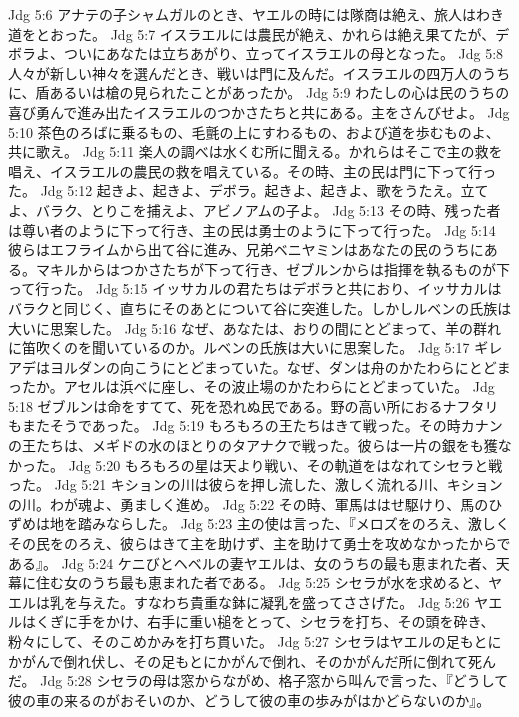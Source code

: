 Jdg 5:6  アナテの子シャムガルのとき、ヤエルの時には隊商は絶え、旅人はわき道をとおった。
Jdg 5:7  イスラエルには農民が絶え、かれらは絶え果てたが、デボラよ、ついにあなたは立ちあがり、立ってイスラエルの母となった。
Jdg 5:8  人々が新しい神々を選んだとき、戦いは門に及んだ。イスラエルの四万人のうちに、盾あるいは槍の見られたことがあったか。
Jdg 5:9  わたしの心は民のうちの喜び勇んで進み出たイスラエルのつかさたちと共にある。主をさんびせよ。
Jdg 5:10  茶色のろばに乗るもの、毛氈の上にすわるもの、および道を歩むものよ、共に歌え。
Jdg 5:11  楽人の調べは水くむ所に聞える。かれらはそこで主の救を唱え、イスラエルの農民の救を唱えている。その時、主の民は門に下って行った。
Jdg 5:12  起きよ、起きよ、デボラ。起きよ、起きよ、歌をうたえ。立てよ、バラク、とりこを捕えよ、アビノアムの子よ。
Jdg 5:13  その時、残った者は尊い者のように下って行き、主の民は勇士のように下って行った。
Jdg 5:14  彼らはエフライムから出て谷に進み、兄弟ベニヤミンはあなたの民のうちにある。マキルからはつかさたちが下って行き、ゼブルンからは指揮を執るものが下って行った。
Jdg 5:15  イッサカルの君たちはデボラと共におり、イッサカルはバラクと同じく、直ちにそのあとについて谷に突進した。しかしルベンの氏族は大いに思案した。
Jdg 5:16  なぜ、あなたは、おりの間にとどまって、羊の群れに笛吹くのを聞いているのか。ルベンの氏族は大いに思案した。
Jdg 5:17  ギレアデはヨルダンの向こうにとどまっていた。なぜ、ダンは舟のかたわらにとどまったか。アセルは浜べに座し、その波止場のかたわらにとどまっていた。
Jdg 5:18  ゼブルンは命をすてて、死を恐れぬ民である。野の高い所におるナフタリもまたそうであった。
Jdg 5:19  もろもろの王たちはきて戦った。その時カナンの王たちは、メギドの水のほとりのタアナクで戦った。彼らは一片の銀をも獲なかった。
Jdg 5:20  もろもろの星は天より戦い、その軌道をはなれてシセラと戦った。
Jdg 5:21  キションの川は彼らを押し流した、激しく流れる川、キションの川。わが魂よ、勇ましく進め。
Jdg 5:22  その時、軍馬ははせ駆けり、馬のひずめは地を踏みならした。
Jdg 5:23  主の使は言った、『メロズをのろえ、激しくその民をのろえ、彼らはきて主を助けず、主を助けて勇士を攻めなかったからである』。
Jdg 5:24  ケニびとヘベルの妻ヤエルは、女のうちの最も恵まれた者、天幕に住む女のうち最も恵まれた者である。
Jdg 5:25  シセラが水を求めると、ヤエルは乳を与えた。すなわち貴重な鉢に凝乳を盛ってささげた。
Jdg 5:26  ヤエルはくぎに手をかけ、右手に重い槌をとって、シセラを打ち、その頭を砕き、粉々にして、そのこめかみを打ち貫いた。
Jdg 5:27  シセラはヤエルの足もとにかがんで倒れ伏し、その足もとにかがんで倒れ、そのかがんだ所に倒れて死んだ。
Jdg 5:28  シセラの母は窓からながめ、格子窓から叫んで言った、『どうして彼の車の来るのがおそいのか、どうして彼の車の歩みがはかどらないのか』。
